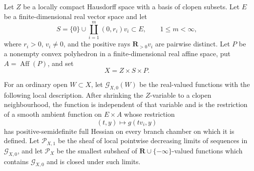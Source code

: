 \begin{theorem}
\label{thm:p071-stone-finite-star-polyhedral-collapse}
Let \(Z\) be a locally compact Hausdorff space with a basis of clopen
subsets.  Let \(E\) be a finite-dimensional real vector space and let
\[
 S=\{0\}\cup\coprod_{i=1}^{m}(0,r_i)v_i\subset E,
 \qquad 1\leq m<\infty,
\]
where \(r_i>0\), \(v_i\ne0\), and the positive rays
\(\mathbf R_{>0}v_i\) are pairwise distinct.  Let \(P\) be a nonempty
convex polyhedron in a finite-dimensional real affine space, put
\(A=\operatorname{Aff}(P)\), and set
\[
                              X=Z\times S\times P.
\]

For an ordinary open \(W\subset X\), let \(\mathcal G_{X,0}(W)\) be the
real-valued functions with the following local description.  After
shrinking the \(Z\)-variable to a clopen neighbourhood, the function is
independent of that variable and is the restriction of a smooth ambient
function on \(E\times A\) whose restriction
\[
                 (t,y)\longmapsto g(tv_i,y)
\]
has positive-semidefinite full Hessian on every branch chamber on which it
is defined.  Let \(\mathcal P_{X,1}\) be the sheaf of local pointwise
decreasing limits of sequences in \(\mathcal G_{X,0}\), and let
\(\mathcal P_X\) be the smallest subsheaf of
\(\mathbf R\cup\{-\infty\}\)-valued functions which contains
\(\mathcal G_{X,0}\) and is closed under such limits.


\end{theorem}
